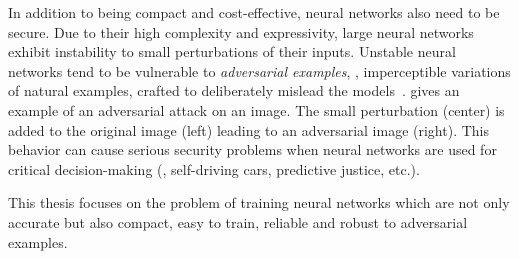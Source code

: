 In addition to being compact and cost-effective, neural networks also need to be secure.
Due to their high complexity and expressivity, large neural networks exhibit instability to small perturbations of their inputs.
Unstable neural networks tend to be vulnerable to \emph{adversarial examples}, \ie, imperceptible variations of natural examples, crafted to deliberately mislead the models~\cite{globerson2006nightmare,biggio2013evasion,szegedy2013intriguing}.
 gives an example of an adversarial attack on an image.
The small perturbation (center) is added to the original image (left) leading to an adversarial image (right).
This behavior can cause serious security problems when neural networks are used for critical decision-making (\eg, self-driving cars, predictive justice, etc.).

This thesis focuses on the problem of training neural networks which are not only accurate but also compact, easy to train, reliable and robust to adversarial examples.





%







